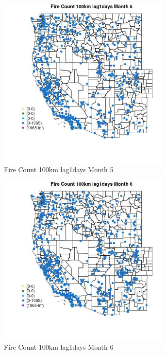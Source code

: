 \begin{figure} 
\centering  
\includegraphics[width=0.77\textwidth]{Code_Outputs/Report_ML_input_PM25_Step4_part_f_de_duplicated_aveswNAs_MapObsMo5Fire_Count_100km_lag1days.jpg} 
\caption{\label{fig:Report_ML_input_PM25_Step4_part_f_de_duplicated_aveswNAsMapObsMo5Fire_Count_100km_lag1days}Fire Count 100km lag1days Month 5} 
\end{figure} 
 

\clearpage 

\begin{figure} 
\centering  
\includegraphics[width=0.77\textwidth]{Code_Outputs/Report_ML_input_PM25_Step4_part_f_de_duplicated_aveswNAs_MapObsMo6Fire_Count_100km_lag1days.jpg} 
\caption{\label{fig:Report_ML_input_PM25_Step4_part_f_de_duplicated_aveswNAsMapObsMo6Fire_Count_100km_lag1days}Fire Count 100km lag1days Month 6} 
\end{figure} 
 

